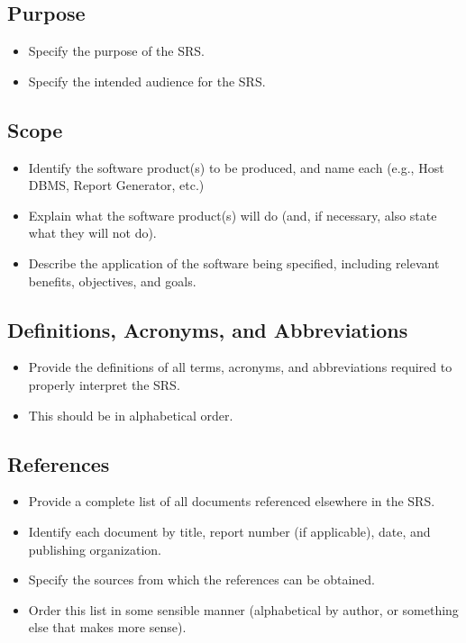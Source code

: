 \documentclass[]{article}
\begin{document}
\subsection{Purpose}
\label{sub:purpose}
\begin{itemize}
	\item Specify the purpose of the SRS.
	\item Specify the intended audience for the SRS.
\end{itemize}

\subsection{Scope}
\label{sub:scope}
\begin{itemize}
	\item Identify the software product(s) to be produced, and name each (e.g., Host DBMS, Report Generator, etc.)
	\item Explain what the software product(s) will do (and, if necessary, also state what they will not do).
	\item Describe the application of the software being specified, including relevant benefits, objectives, and goals.
\end{itemize}

\subsection{Definitions, Acronyms, and Abbreviations}
\label{sub:definitions_acronyms_and_abbreviations}
\begin{itemize}
	\item Provide the definitions of all terms, acronyms, and abbreviations required to properly interpret the SRS.
	\item This should be in alphabetical order.
\end{itemize}

\subsection{References}
\label{sub:references}
\begin{itemize}
	\item Provide a complete list of all documents referenced elsewhere in the SRS.
	\item Identify each document by title, report number (if applicable), date, and publishing organization.
	\item Specify the sources from which the references can be obtained.
	\item Order this list in some sensible manner (alphabetical by author, or something else that makes more sense).
\end{itemize}
\end{document}

